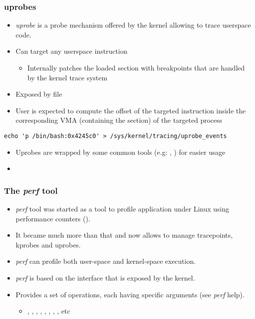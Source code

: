 \begin{frame}[fragile]
  \frametitle{uprobes}
  \begin{itemize}
    \item {\em uprobe} is a probe mechanism offered by the kernel allowing
	    to trace userspace code.
    \item Can target any userspace instruction
    \begin{itemize}
      \item Internally patches the loaded  section with breakpoints
        that are handled by the kernel trace system
    \end{itemize}
    \item Exposed by file 
    \item User is expected to compute the offset of the targeted
	    instruction inside the corresponding VMA (containing the
	     section) of the targeted process
  \end{itemize}
  \begin{block}{}
	  \begin{verbatim}
echo 'p /bin/bash:0x4245c0' > /sys/kernel/tracing/uprobe_events
	  \end{verbatim}
  \end{block}
  \begin{itemize}
	  \item Uprobes are wrapped by some common tools (e.g:
		  , ) for easier usage
	  \item {}
  \end{itemize}
\end{frame}

\begin{frame}[fragile]
  \frametitle{The {\em perf} tool}
  \begin{itemize}
    \item {\em perf} tool was started as a tool to profile application under
          Linux using performance counters ().
    \item It became much more than that and now allows to manage tracepoints,
          kprobes and uprobes.
    \item {\em perf} can profile both user-space and kernel-space execution.
    \item {\em perf} is based on the  interface that is
          exposed by the kernel.
    \item Provides a set of operations, each having specific arguments (see
          {\em perf} help).
    \begin{itemize}
      \item {}, , , , , , , , etc
    \end{itemize}
  \end{itemize}
\end{frame}

